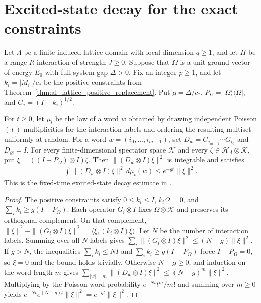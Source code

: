 
\section{Excited-state decay for the exact constraints}

\begin{lemma}
    \label{thm:al_lattice_excited_decay}
    \leanok
    Let $\Lambda$ be a finite induced lattice domain with local dimension
    $q\ge1$, and let $H$ be a range-$R$ interaction of strength $J\ge0$.
    Suppose that $\Omega$ is a unit ground vector of energy $E_0$ with
    full-system gap $\Delta>0$. Fix an integer $p\ge1$, and let
    $k_i=|M_i|/c_*$ be the positive constraints from
    Theorem~\ref{thm:al_lattice_positive_replacement}. Put
    $g=\Delta/c_*$, $P_\Omega=|\Omega\rangle\langle\Omega|$, and
    $G_i=(I-k_i)^{1/2}$.

    For $t\ge0$, let $\mu_t$ be the law of a word $w$ obtained by drawing
    independent Poisson$(\,t\,)$ multiplicities for the interaction labels
    and ordering the resulting multiset uniformly at random. For a word
    $w=(i_0,\ldots,i_{m-1})$, set
    $D_w=G_{i_{m-1}}\cdots G_{i_0}$ and $D_{\varnothing}=I$.
    For every finite-dimensional spectator space $\mathcal K$ and every
    $\zeta\in\mathcal H_\Lambda\otimes\mathcal K$, put
    $\xi=((I-P_\Omega)\otimes I)\zeta$. Then
    $\|(D_w\otimes I)\xi\|^2$ is integrable and satisfies
    \begin{align*}
        \int\|(D_w\otimes I)\xi\|^2\,d\mu_t(w)
        \le e^{-gt}\|\xi\|^2.
    \end{align*}
    This is the fixed-time excited-state decay estimate in
    \cite[Section~10]{OpenAI2026AreaLaw}.
\end{lemma}
\begin{proof}\leanok
    The positive constraints satisfy $0\le k_i\le I$, $k_i\Omega=0$,
    and $\sum_i k_i\ge g(I-P_\Omega)$. Each operator $G_i\otimes I$ fixes
    $\Omega\otimes\mathcal K$ and preserves its orthogonal complement. On
    that complement,
    $\|\xi\|^2-\|(G_i\otimes I)\xi\|^2=\langle\xi,(k_i\otimes I)\xi\rangle$.
    Let $N$ be the number of interaction labels. Summing over all $N$
    labels gives $\sum_i\|(G_i\otimes I)\xi\|^2\le(N-g)\|\xi\|^2$.
    If $g>N$, the inequalities $\sum_i k_i\le NI$ and
    $\sum_i k_i\ge g(I-P_\Omega)$ force $I-P_\Omega=0$, so $\xi=0$
    and the bound holds trivially. Otherwise $N-g\ge0$, and induction on
    the word length $m$ gives
    $\sum_{|w|=m}\|(D_w\otimes I)\xi\|^2\le(N-g)^m\|\xi\|^2$.
    Multiplying by the Poisson-word probability $e^{-Nt}t^m/m!$ and
    summing over $m\ge0$ yields $e^{-Nt}e^{(N-g)t}\|\xi\|^2=e^{-gt}\|\xi\|^2$.
\end{proof}


